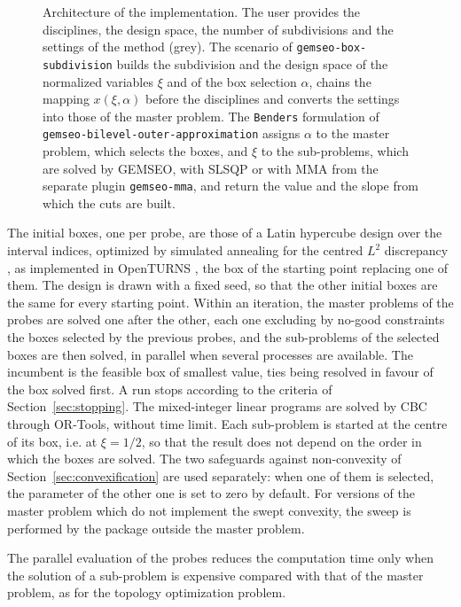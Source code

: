 \documentclass[pdflatex,sn-basic]{sn-jnl}
\newcommand{\code}[1]{\texttt{\hyphenchar\font=45\relax #1}}
\begin{document}
\begin{figure}[!htbp]
  \centering
  \resizebox{\linewidth}{!}{}
  \caption{Architecture of the implementation. The user provides the
    disciplines, the design space, the number of subdivisions and the settings
    of the method (grey). The scenario of \code{gemseo-box-subdivision} builds
    the subdivision and the design space of the normalized variables $\xi$ and
    of the box selection $\alpha$, chains the mapping $x(\xi, \alpha)$ before
    the disciplines and converts the settings into those of the master problem.
    The \code{Benders} formulation of \code{gemseo-bilevel-outer-approximation}
    assigns $\alpha$ to the master problem, which selects the boxes, and $\xi$
    to the sub-problems, which are solved by GEMSEO, with SLSQP or with MMA from
    the separate plugin \code{gemseo-mma}, and return the value and the slope
    from which the cuts are built.}
  \label{fig:architecture}
\end{figure}

The initial boxes, one per probe, are those of a Latin hypercube design
\citep{mckay1979} over the interval indices, optimized by simulated annealing
for the centred $L^2$ discrepancy \citep{hickernell1998}, as implemented in
OpenTURNS \citep{baudin2017}, the box of the starting point replacing one of
them. The design is drawn with a fixed seed, so that the other initial boxes
are the same for every starting point. Within an iteration, the master problems of the probes are solved one after the
other, each one excluding by no-good constraints the boxes selected by the
previous probes, and the sub-problems of the selected boxes are then solved, in
parallel when several processes are available. The incumbent is the feasible
box of smallest value, ties being resolved in favour of the box solved first. A
run stops according to the criteria of Section~\ref{sec:stopping}. The mixed-integer linear programs are solved
by CBC through OR-Tools, without time limit.
Each sub-problem is started at the centre of its box, i.e. at $\xi = 1/2$, so
that the result does not depend on the order in which the boxes are solved. The
two safeguards against non-convexity of Section~\ref{sec:convexification} are
used separately: when one of them is selected, the parameter of the other one is
set to zero by default. For versions of the master problem which do not
implement the swept convexity, the sweep is performed by the package outside the
master problem.

The parallel evaluation of the probes reduces the computation time
only when the solution of a sub-problem is expensive compared with that of the
master problem, as for the topology optimization problem.
\end{document}
